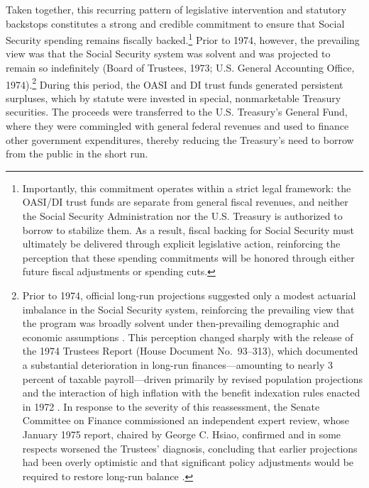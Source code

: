 \documentclass[12pt]{article}%
\theoremstyle{remark}
\begin{document}
Taken together, this recurring pattern of legislative intervention and statutory backstops constitutes a strong and credible commitment to ensure that Social Security spending remains fiscally backed.\footnote{Importantly, this commitment operates within a strict legal framework: the OASI/DI trust funds are separate from general fiscal revenues, and neither the Social Security Administration nor the U.S. Treasury is authorized to borrow to stabilize them. As a result, fiscal backing for Social Security must ultimately be delivered through explicit legislative action, reinforcing the perception that these spending commitments will be honored through either future fiscal adjustments or spending cuts.}
Prior to 1974, however, the prevailing view was that the Social Security system was solvent and was projected to remain so indefinitely (Board of Trustees, 1973; U.S. General Accounting Office, 1974).\footnote{Prior to 1974, official long-run projections suggested only a modest actuarial imbalance in the Social Security system, reinforcing the prevailing view that the program was broadly solvent under then-prevailing demographic and economic assumptions \citep{SSA1973Trustees,GAO1974SSFinancing}. This perception changed sharply with the release of the 1974 Trustees Report (House Document No.~93--313), which documented a substantial deterioration in long-run finances---amounting to nearly 3 percent of taxable payroll---driven primarily by revised population projections and the interaction of high inflation with the benefit indexation rules enacted in 1972 \citep{SSA1974Trustees}. In response to the severity of this reassessment, the Senate Committee on Finance commissioned an independent expert review, whose January 1975 report, chaired by George C. Hsiao, confirmed and in some respects worsened the Trustees' diagnosis, concluding that earlier projections had been overly optimistic and that significant policy adjustments would be required to restore long-run balance \citep{Hsiao1975Report}.} 
During this period, the OASI and DI trust funds generated persistent surpluses, which by statute were invested in special, nonmarketable Treasury securities. The proceeds were transferred to the U.S. Treasury’s General Fund, where they were commingled with general federal revenues and used to finance other government expenditures, thereby reducing the Treasury’s need to borrow from the public in the short run.
\end{document}
